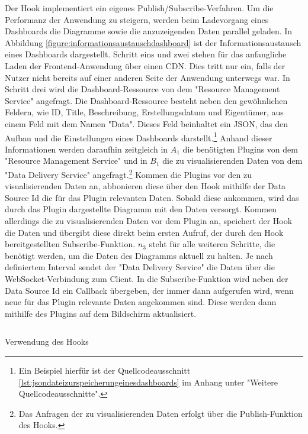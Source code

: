 Der  Hook implementiert ein eigenes Publish/Subscribe-Verfahren.
Um die Performanz der Anwendung zu steigern, werden beim Ladevorgang eines Dashboards
die Diagramme sowie die anzuzeigenden Daten parallel geladen. In Abbildung \ref{figure:informationsaustauschdashboard}
ist der Informationsaustausch eines Dashboards dargestellt. Schritt eins und zwei stehen
für das anfangliche Laden der Frontend-Anwendung über einen CDN. Dies tritt nur ein,
falls der Nutzer nicht bereits auf einer anderen Seite der Anwendung unterwegs war.
In Schritt drei wird die Dashboard-Ressource von dem "Resource Management Service" angefragt.
Die Dashboard-Ressource besteht neben den gewöhnlichen Feldern, wie ID, Title, Beschreibung,
Erstellungsdatum und Eigentümer, aus einem Feld mit dem Namen "Data". Dieses Feld beinhaltet
ein JSON, das den Aufbau und die Einstellungen eines Dashboards darstellt.\footnote{Ein
Beispiel hierfür ist der Quellcodeausschnitt \ref{lst:jsondateizurspeicherungeinesdashboards}
im Anhang unter "Weitere Quellcodeausschnitte".} Anhand dieser Informationen werden
daraufhin zeitgleich in \( A_1 \) die benötigten Plugins von dem "Resource Management Service"
und in \( B_1 \) die zu visualisierenden Daten von dem "Data Delivery Service" angefragt.\footnote{Das Anfragen
der zu visualisierenden Daten erfolgt über die Publish-Funktion des 
 Hooks.}
Kommen die Plugins vor den zu visualisierenden Daten an, abbonieren diese über 
den  Hook mithilfe der Data Source Id die für das Plugin relevanten
Daten. Sobald diese ankommen, wird das durch das Plugin dargestellte Diagramm mit
den Daten versorgt. Kommen allerdings die zu visualisierenden Daten vor dem Plugin an,
speichert der  Hook die Daten und übergibt diese direkt beim
ersten Aufruf, der durch den  Hook bereitgestellten
Subscribe-Funktion. \( n_3 \) steht für alle weiteren Schritte, die benötigt werden,
um die Daten des Diagramms aktuell zu halten. Je nach definiertem Interval sendet
der "Data Delivery Service" die Daten über die WebSocket-Verbindung zum Client.
In die Subscribe-Funktion wird neben der Data Source Id ein Callback übergeben,
der immer dann aufgerufen wird, wenn neue für das Plugin relevante Daten angekommen sind.
Diese werden dann mithilfe des Plugins auf dem Bildschirm aktualisiert.

\begin{listing}
    \inputminted{jsx}{snippets/jsx/useModalBeispiel.jsx}
    \caption{Verwendung des  Hooks}
    \label{lst:verwendungdesusemodalhooks}
\end{listing}


